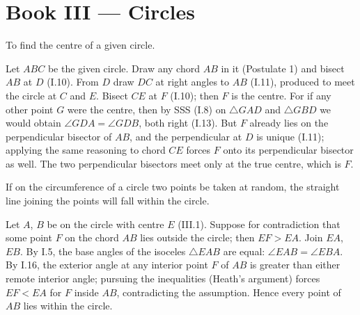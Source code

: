 %
%

\section{Book III --- Circles}
\label{sec:book-III}

\begin{claim}
\label{prop:III.1}
To find the centre of a given circle.
\end{claim}
\begin{evidence}
\label{ev:III.1}
Let $ABC$ be the given circle.  Draw any chord $AB$ in it (Postulate
1) and bisect $AB$ at $D$ (I.10).  From $D$ draw $DC$ at right
angles to $AB$ (I.11), produced to meet the circle at $C$ and $E$.
Bisect $CE$ at $F$ (I.10); then $F$ is the centre.  For if any other
point $G$ were the centre, then by SSS (I.8) on $\triangle GAD$ and
$\triangle GBD$ we would obtain $\angle GDA = \angle GDB$, both
right (I.13).  But $F$ already lies on the perpendicular bisector
of $AB$, and the perpendicular at $D$ is unique (I.11); applying
the same reasoning to chord $CE$ forces $F$ onto its perpendicular
bisector as well.  The two perpendicular bisectors meet only at the
true centre, which is $F$.
\end{evidence}

\begin{claim}
\label{prop:III.2}
If on the circumference of a circle two points be taken at random,
the straight line joining the points will fall within the circle.
\end{claim}
\begin{evidence}
\label{ev:III.2}
Let $A$, $B$ be on the circle with centre $E$ (III.1).  Suppose for
contradiction that some point $F$ on the chord $AB$ lies outside the
circle; then $EF > EA$.  Join $EA$, $EB$.  By I.5, the base angles
of the isoceles $\triangle EAB$ are equal: $\angle EAB = \angle
EBA$.  By I.16, the exterior angle at any interior point $F$ of
$AB$ is greater than either remote interior angle; pursuing the
inequalities (Heath's argument) forces $EF < EA$ for $F$ inside
$AB$, contradicting the assumption.  Hence every point of $AB$ lies
within the circle.
\end{evidence}

